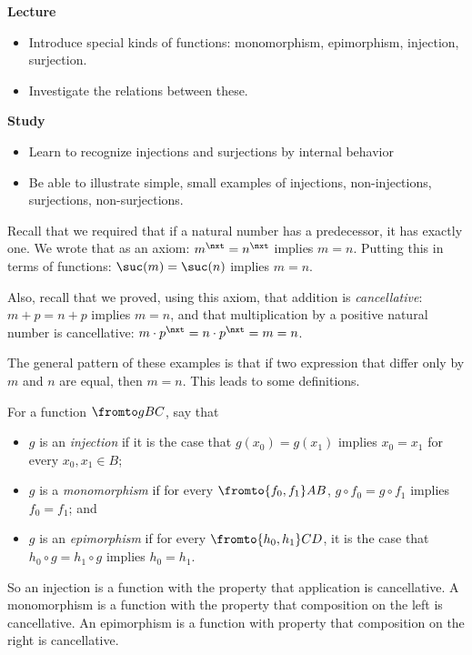 \begin{goals}
	\noindent\textbf{Lecture}
	\begin{itemize}
		\item Introduce special kinds of functions: monomorphism, epimorphism, injection, surjection.
		\item Investigate the relations between these.
	\end{itemize}
	
	\noindent\textbf{Study}
	\begin{itemize}
		\item Learn to recognize injections and surjections by internal behavior
		\item Be able to illustrate simple, small examples of injections, non-injections, surjections, non-surjections.
	\end{itemize}
\end{goals}

Recall that we required that if a natural number has a predecessor, it has exactly one. 
We wrote that as an axiom: $m^\nxt = n^\nxt$ implies $m=n$.
Putting this in terms of functions: $\suc(m) = \suc(n)$ implies $m=n$.

Also, recall that we proved, using this axiom, that addition is \emph{cancellative}: $m+p = n+p$
implies $m=n$, and that multiplication by a positive natural number is cancellative:
$m\cdot p^\nxt = n\cdot p^\nxt = m=n$.

The general pattern of these examples is that if two expression that differ only by $m$ and $n$ are equal, then $m=n$. This leads to some definitions.

\begin{defn}
	For a function $\fromto gBC$, say that
	\begin{itemize}
		\item $g$ is an \emph{injection} if it is the case that $g(x_0)=g(x_1)$ implies $x_0=x_1$ for every $x_0,x_1\in B$;
		\item $g$ is a \emph{monomorphism} if for every $\fromto {f_0,f_1}AB$, $g\circ f_0=g\circ f_1$ implies $f_0=f_1$; and
		\item $g$ is an \emph{epimorphism} if for every $\fromto {h_0,h_1}CD$,
		it is the case that $h_0\circ g = h_1\circ g$ implies $h_0=h_1$.
	\end{itemize}  
\end{defn}

So an injection is a function with the property that application is cancellative.
A monomorphism is a function with the property that composition on the left is cancellative. 
An epimorphism is a function with property that composition on the right is cancellative.

